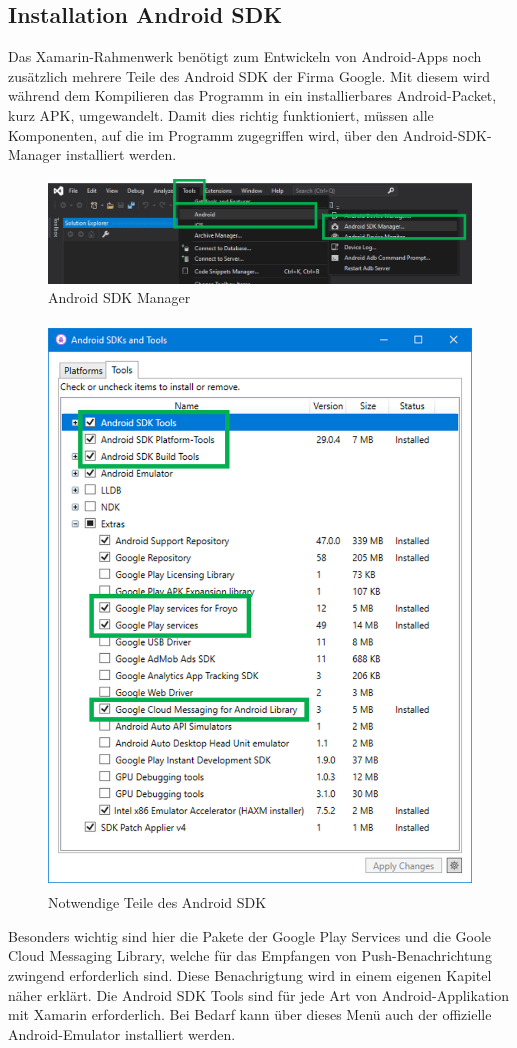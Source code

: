 \subsection{Installation Android SDK}
Das Xamarin-Rahmenwerk benötigt zum Entwickeln von Android-Apps noch zusätzlich mehrere Teile des Android SDK der Firma Google. Mit diesem wird während dem Kompilieren das Programm in ein installierbares Android-Packet, kurz APK, umgewandelt.
Damit dies richtig funktioniert, müssen alle Komponenten, auf die im Programm zugegriffen wird, über den Android-SDK-Manager installiert werden.
\begin{figure}[H]
    \centering\includegraphics[width=0.9\linewidth]{images/auswahl_rahmenwerk/android_sdk_installation.png}    
    \caption{Android SDK Manager}
\end{figure}
\begin{figure}[H]
    \centering\includegraphics[height=15cm]{images/auswahl_rahmenwerk/android_sdk_auswahl.png}    
    \caption{Notwendige Teile des Android SDK}
\end{figure}
Besonders wichtig sind hier die Pakete der Google Play Services und die Goole Cloud Messaging Library, welche für das Empfangen von Push-Benachrichtung zwingend erforderlich sind. Diese Benachrigtung wird in einem eigenen Kapitel näher erklärt.
Die Android SDK Tools sind für jede Art von Android-Applikation mit Xamarin erforderlich.
Bei Bedarf kann über dieses Menü auch der offizielle Android-Emulator installiert werden.


